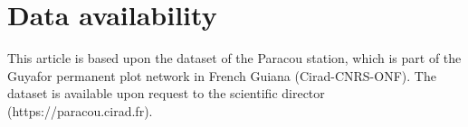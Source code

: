 \documentclass[fleqn,10pt]{ArtEcoFoG} %
\begin{document}
\section{Data availability}\label{data-availability}

This article is based upon the dataset of the Paracou station, which is
part of the Guyafor permanent plot network in French Guiana
(Cirad-CNRS-ONF). The dataset is available upon request to the
scientific director (https://paracou.cirad.fr).



\makeatletter

\makeatother


\end{document}
